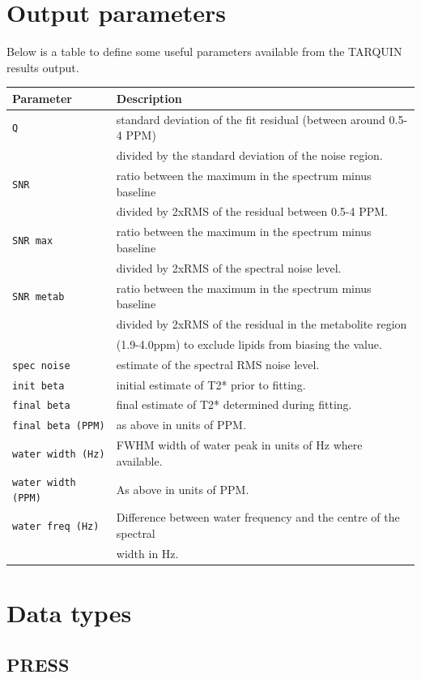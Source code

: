 \documentclass[a4paper,12pt]{article}
\begin{document}
\section{Output parameters}
Below is a table to define some useful parameters available from the TARQUIN results output.

\begin{tabular}{l l}
Parameter & Description \\
\hline
\texttt{Q} & standard deviation of the fit residual (between around 0.5-4 PPM) \\& divided by the standard deviation of the noise region. \\
\texttt{SNR} & ratio between the maximum in the spectrum minus baseline \\& divided by 2xRMS of the residual between 0.5-4 PPM. \\
\texttt{SNR max} & ratio between the maximum in the spectrum minus baseline \\& divided by 2xRMS of the spectral noise level. \\
\texttt{SNR metab} & ratio between the maximum in the spectrum minus baseline \\& divided by 2xRMS of the residual in the metabolite region \\& (1.9-4.0ppm) to exclude lipids from biasing the value. \\
\texttt{spec noise} & estimate of the spectral RMS noise level. \\
\texttt{init beta} & initial estimate of T2* prior to fitting. \\
\texttt{final beta} & final estimate of T2* determined during fitting. \\
\texttt{final beta (PPM)} & as above in units of PPM.\\
\texttt{water width (Hz)} & FWHM width of water peak in units of Hz where available. \\
\texttt{water width (PPM)} & As above in units of PPM. \\
\texttt{water freq (Hz)} & Difference between water frequency and the centre of the spectral \\& width in Hz. \\
\end{tabular}

\section{Data types}
\subsection{PRESS}
\end{document}

